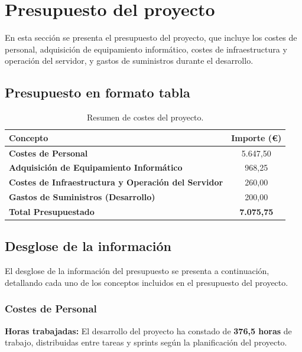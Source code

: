 \section{Presupuesto del proyecto}

En esta sección se presenta el presupuesto del proyecto, que incluye los costes de personal, adquisición de equipamiento informático, costes de infraestructura y operación del servidor, y gastos de suministros durante el desarrollo.

\subsection{Presupuesto en formato tabla}

\begin{table}[H]
\centering
\begin{tabular}{|l|c|}
\hline
\textbf{Concepto} & \textbf{Importe (€)} \\ \hline
\textbf{Costes de Personal} & 5.647,50 \\ \hline
\textbf{Adquisición de Equipamiento Informático} & 968,25 \\ \hline
\textbf{Costes de Infraestructura y Operación del Servidor} & 260,00 \\ \hline
\textbf{Gastos de Suministros (Desarrollo)} & 200,00 \\ \hline
\textbf{Total Presupuestado} & \textbf{7.075,75} \\ \hline
\end{tabular}
\caption{Resumen de costes del proyecto.}
\label{tab:presupuesto_actualizado}
\end{table}

\subsection{Desglose de la información}

El desglose de la información del presupuesto se presenta a continuación, detallando cada uno de los conceptos incluidos en el presupuesto del proyecto.

\subsubsection{Costes de Personal}

\textbf{Horas trabajadas:} El desarrollo del proyecto ha constado de \textbf{376,5 horas} de trabajo, distribuidas entre tareas y sprints según la planificación del proyecto.

